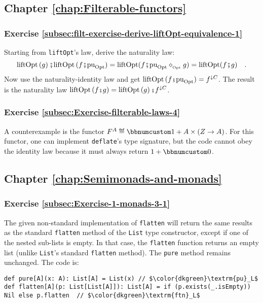\subsection*{Chapter \ref{chap:Filterable-functors}}

\subsubsection*{Exercise \ref{subsec:filt-exercise-derive-liftOpt-equivalence-1}}

Starting from \lstinline!liftOpt!\textsf{'}s law, derive the naturality law:
\[
\text{liftOpt}\left(g\right)\bef\text{liftOpt}\,(f\bef\text{pu}_{\text{Opt}})=\text{liftOpt}(f\bef\text{pu}_{\text{Opt}}\diamond_{_{\text{Opt}}}g)=\text{liftOpt}(f\bef g)\quad.
\]
Now use the naturality-identity law and get $\text{liftOpt}\,(f\bef\text{pu}_{\text{Opt}})=f^{\downarrow C}$.
The result is the naturality law $\text{liftOpt}\left(f\bef g\right)=\text{liftOpt}\left(g\right)\bef f^{\downarrow C}$.

\subsubsection*{Exercise \ref{subsec:Exercise-filterable-laws-4}}

A counterexample is the functor $F^{A}\triangleq\bbnum 1+A\times\left(Z\rightarrow A\right)$.
For this functor, one can implement \lstinline!deflate!\textsf{'}s type signature,
but the code cannot obey the identity law because it must always return
$1+\bbnum 0$.

\subsection*{Chapter \ref{chap:Semimonads-and-monads}}

\subsubsection*{Exercise \ref{subsec:Exercise-1-monads-3-1}}

The given non-standard implementation of \lstinline!flatten! will
return the same results as the standard \lstinline!flatten! method
of the \lstinline!List! type constructor, except if one of the nested
sub-lists is empty. In that case, the \lstinline!flatten! function
returns an empty list (unlike \lstinline!List!\textsf{'}s standard \lstinline!flatten!
method). The \lstinline!pure! method remains unchanged. The code
is:
\begin{lstlisting}[mathescape=true]
def pure[A](x: A): List[A] = List(x) // $\color{dkgreen}\textrm{pu}_L$
def flatten[A](p: List[List[A]]): List[A] = if (p.exists(_.isEmpty)) Nil else p.flatten  // $\color{dkgreen}\textrm{ftn}_L$
\end{lstlisting}

